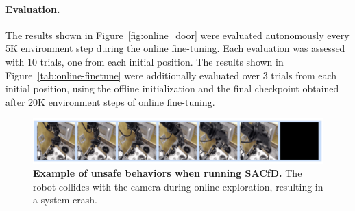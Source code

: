 \documentclass[../thesis.tex]{subfiles}
\begin{document}
\paragraph{Evaluation.} The results shown in Figure~\ref{fig:online_door} were evaluated autonomously every 5K environment step during the online fine-tuning. Each evaluation was assessed with 10 trials, one from each initial position. The results shown in Figure~\ref{tab:online-finetune} were additionally evaluated over 3 trials from each initial position, using the offline initialization and the final checkpoint obtained after 20K environment steps of online fine-tuning.

\begin{figure}
\includegraphics[width=\linewidth]{chapters/ptr/dangerous_actions.jpeg}
\caption{\footnotesize{\label{fig:dangerous-actions} \textbf{Example of unsafe behaviors when running SACfD.} The robot collides with the camera during online exploration, resulting in a system crash.}}
\end{figure}
\end{document}
